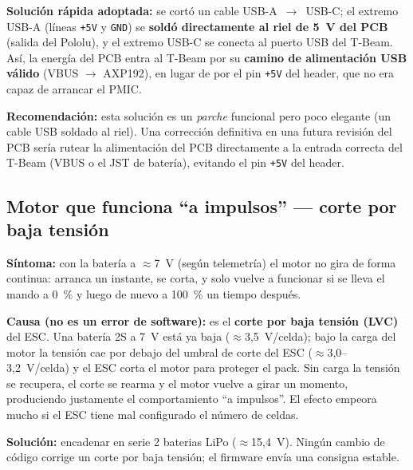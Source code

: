\documentclass[12pt,a4paper]{article}
\begin{document}
\begin{okbox}
  \textbf{Soluci\'on r\'apida adoptada:} se cort\'o un cable USB-A~$\to$~USB-C; el
  extremo USB-A (l\'ineas \texttt{+5V} y \texttt{GND}) se \textbf{sold\'o
  directamente al riel de 5~V del PCB} (salida del Pololu), y el extremo USB-C se
  conecta al puerto USB del T-Beam. As\'i, la energ\'ia del PCB entra al T-Beam por
  su \textbf{camino de alimentaci\'on USB v\'alido} (VBUS $\to$ AXP192), en lugar de
  por el pin \texttt{+5V} del header, que no era capaz de arrancar el PMIC.

  \textbf{Recomendaci\'on:} esta soluci\'on es un \emph{parche} funcional pero poco
  elegante (un cable USB soldado al riel). Una correcci\'on definitiva en una
  futura revisi\'on del PCB ser\'ia rutear la alimentaci\'on del PCB directamente a
  la entrada correcta del T-Beam (VBUS o el JST de bater\'ia), evitando el pin
  \texttt{+5V} del header.
\end{okbox}

\subsection{Motor que funciona ``a impulsos'' --- corte por baja tensi\'on}
\label{subsec:lvc}

\begin{warningbox}
  \textbf{S\'intoma:} con la bater\'ia a $\approx$7~V (seg\'un telemetr\'ia) el
  motor no gira de forma continua: arranca un instante, se corta, y solo vuelve a
  funcionar si se lleva el mando a 0~\% y luego de nuevo a 100~\% un tiempo
  despu\'es.

  \textbf{Causa (no es un error de software):} es el \textbf{corte por baja
  tensi\'on (LVC)} del ESC. Una bater\'ia 2S a 7~V est\'a ya baja
  ($\approx$3,5~V/celda); bajo la carga del motor la tensi\'on cae por debajo del
  umbral de corte del ESC ($\approx$3,0--3,2~V/celda) y el ESC corta el motor para
  proteger el pack. Sin carga la tensi\'on se recupera, el corte se rearma y el
  motor vuelve a girar un momento, produciendo justamente el comportamiento ``a
  impulsos''. El efecto empeora mucho si el ESC tiene mal configurado el n\'umero
  de celdas.
\end{warningbox}

\begin{okbox}
  \textbf{Soluci\'on:} encadenar en serie 2 baterias LiPo ($\approx$15,4~V).
  Ning\'un cambio de c\'odigo corrige un corte por baja tensi\'on; el firmware
  env\'ia una consigna estable.
\end{okbox}
\end{document}

